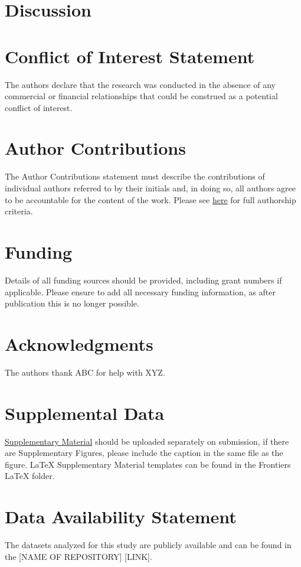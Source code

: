 \documentclass[utf8]{FrontiersinHarvard}
\begin{document}
\section{Discussion}

\section*{Conflict of Interest Statement}
The authors declare that the research was conducted in the absence of any commercial or financial relationships that could be construed as a potential conflict of interest.

\section*{Author Contributions}
The Author Contributions statement must describe the contributions of individual authors referred to by their initials and, in doing so, all authors agree to be accountable for the content of the work.
Please see \href{https://www.frontiersin.org/about/policies-and-publication-ethics#AuthorshipAuthorResponsibilities}{here} for full authorship criteria.

\section*{Funding}
Details of all funding sources should be provided, including grant numbers if applicable.
Please ensure to add all necessary funding information, as after publication this is no longer possible.

\section*{Acknowledgments}
The authors thank ABC for help with XYZ.

\section*{Supplemental Data}
 \href{http://home.frontiersin.org/about/author-guidelines#SupplementaryMaterial}{Supplementary Material} should be uploaded separately on submission, if there are Supplementary Figures, please include the caption in the same file as the figure. LaTeX Supplementary Material templates can be found in the Frontiers LaTeX folder.

\section*{Data Availability Statement} \label{s:data_availability}
The datasets analyzed for this study are publicly available and can be found in the [NAME OF REPOSITORY] [LINK].



\end{document}
